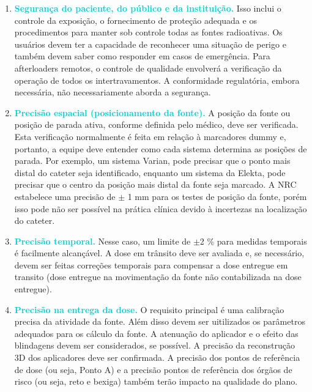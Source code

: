 \documentclass[11pt,a4paper]{article}
\newcounter{exemplo}
\begin{document}
	\begin{enumerate}[label=\textcolor{CarnationPink}{(\roman*)}]
		\item \textcolor{DarkTurquoise}{\textbf{Segurança do paciente, do público e da instituição.}} Isso inclui o controle da exposição, o fornecimento de proteção adequada e os procedimentos para manter sob controle todas as fontes radioativas. Os usuários devem ter a capacidade de reconhecer uma situação de perigo e também devem saber como responder em casos de emergência. Para afterloaders remotos, o controle de qualidade envolverá a verificação da operação de todos os intertravamentos. A conformidade regulatória, embora necessária, não necessariamente aborda a segurança.
		
		\item \textcolor{DarkTurquoise}{\textbf{Precisão espacial (posicionamento da fonte).}} A posição da fonte ou posição de parada ativa, conforme definida pelo médico, deve ser verificada. Esta verificação normalmente é feita em relação à marcadores dummy e, portanto, a equipe deve entender como cada sistema determina as posições de parada. Por exemplo, um sistema Varian, pode precisar que o ponto mais distal do cateter seja identificado, enquanto um sistema da Elekta, pode precisar que o centro da posição mais distal da fonte seja marcado. A NRC estabelece uma precisão de $\pm$ 1 mm para os testes de posição da fonte, porém isso pode não ser possível na prática clínica devido à incertezas na localização do cateter.
		
		\item \textcolor{DarkTurquoise}{\textbf{Precisão temporal.}} Nesse caso, um limite de $\pm$2 \% para medidas temporais é facilmente alcançável. A dose em trânsito deve ser avaliada e, se necessário, devem ser feitas correções temporais para compensar a dose entregue em transito (dose entregue na movimentação da fonte não contabilizada na dose entregue).
		
		\item \textcolor{DarkTurquoise}{\textbf{Precisão na entrega da dose.}} O requisito principal é uma calibração precisa da atividade da fonte. Além disso devem ser uitilizados os parâmetros adequados para os cálculo da fonte. A atenuação do aplicador e o efeito das blindagens devem ser considerados, se possível. A precisão da reconstrução 3D dos aplicadores deve ser confirmada. A precisão dos pontos de referência de dose (ou seja, Ponto A) e a precisão pontos de referência dos órgãos de risco (ou seja, reto e bexiga) também terão impacto na qualidade do plano.
	\end{enumerate}
\end{document}
